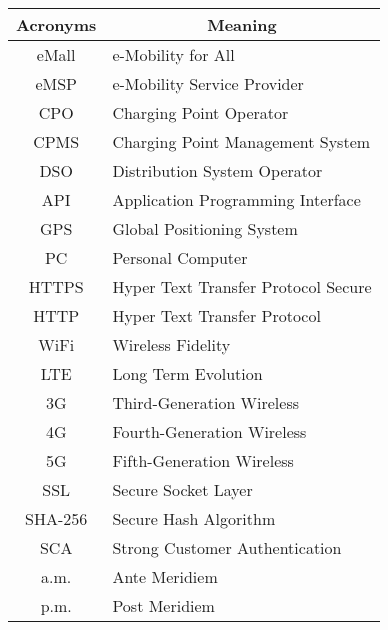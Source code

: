 \begin{table}[H]
\centering
\begin{tabular}{|c|l|}
\hline
\rowcolor[HTML]{B8C8D5} 
\textbf{Acronyms} & \multicolumn{1}{c|}{\cellcolor[HTML]{B8C8D5}\textbf{Meaning}} \\ \hline
eMall             & e-Mobility for All                                            \\ \hline
eMSP              & e-Mobility Service Provider                                   \\ \hline
CPO               & Charging Point Operator                                       \\ \hline
CPMS              & Charging Point Management System                              \\ \hline
DSO               & Distribution System Operator                                  \\ \hline
API               & Application Programming Interface                             \\ \hline
GPS               & Global Positioning System                                     \\ \hline
PC                & Personal Computer                                             \\ \hline
HTTPS             & Hyper Text Transfer Protocol Secure                           \\ \hline
HTTP          & Hyper Text Transfer Protocol                           \\ \hline
WiFi              & Wireless Fidelity                                             \\ \hline
LTE                & Long Term Evolution \\ \hline
3G                & Third-Generation Wireless                                     \\ \hline
4G                & Fourth-Generation Wireless                                    \\ \hline
5G                & Fifth-Generation Wireless                                     \\ \hline
SSL               & Secure Socket Layer                                           \\ \hline
SHA-256           & Secure Hash Algorithm                                          \\ \hline
SCA               & Strong Customer Authentication                                  \\ \hline
a.m.               & Ante Meridiem                                                  \\ \hline
p.m.               & Post Meridiem                                                  \\ \hline
\end{tabular}

\end{table}
